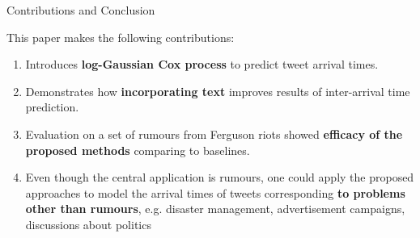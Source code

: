 \documentclass{beamer}
\begin{document}
\begin{frame}{Contributions and Conclusion}
\begin{block}{This paper makes the following contributions:}
\begin{enumerate}
    \item Introduces \textbf{log-Gaussian Cox process} to predict tweet arrival times.
    \item Demonstrates how \textbf{incorporating text} improves results of inter-arrival time prediction.
    \item Evaluation on a set of rumours from Ferguson riots showed \textbf{efficacy of the proposed methods} comparing to baselines.
    \item Even though the central application is rumours, one could apply the proposed approaches to model the arrival times of tweets corresponding \textbf{to problems other than rumours}, e.g. disaster management, advertisement campaigns, discussions about politics
\end{enumerate}
\end{block}
\end{frame}
\end{document}
